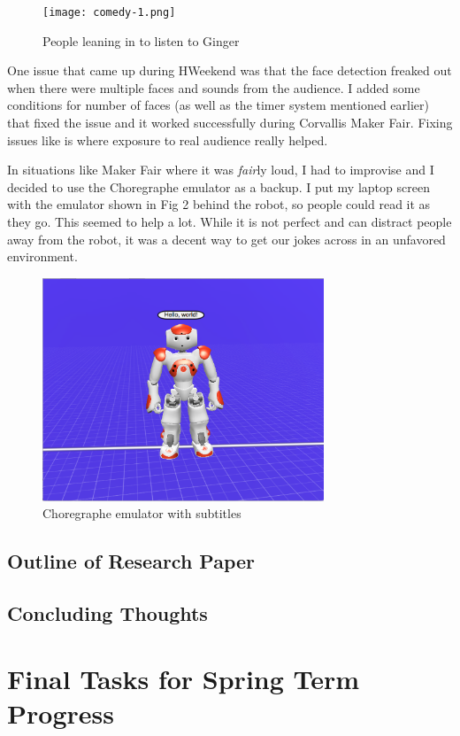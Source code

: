 \documentclass[onecolumn, draftclsnofoot,10pt, compsoc]{IEEEtran}
\begin{document}
\begin{figure}[H]
  \centering
  \texttt{[image: comedy-1.png]}
  \caption{People leaning in to listen to Ginger}
	\label{fig:comedy-1}
\end{figure}

One issue that came up during HWeekend was that the face detection freaked out when there were multiple faces and sounds from the audience. I added some conditions for number of faces (as well as the timer system mentioned earlier) that fixed the issue and it worked successfully during Corvallis Maker Fair. Fixing issues like is where exposure to real audience really helped.

In situations like Maker Fair where it was \textit{fair}ly loud, I had to improvise and I decided to use the Choregraphe emulator as a backup. I put my laptop screen with the emulator shown in Fig 2 behind the robot, so people could read it as they go. This seemed to help a lot. While it is not perfect and can distract people away from the robot, it was a decent way to get our jokes across in an unfavored environment.

\begin{figure}[H]
  \centering
  \includegraphics[width=0.75\textwidth,height=0.75\textheight,keepaspectratio]{comedy-2.png}
  \caption{Choregraphe emulator with subtitles}
	\label{fig:comedy-2}
\end{figure}

\subsection{Outline of Research Paper}
\subsection{Concluding Thoughts}


\section{Final Tasks for Spring Term Progress}
\end{document}
